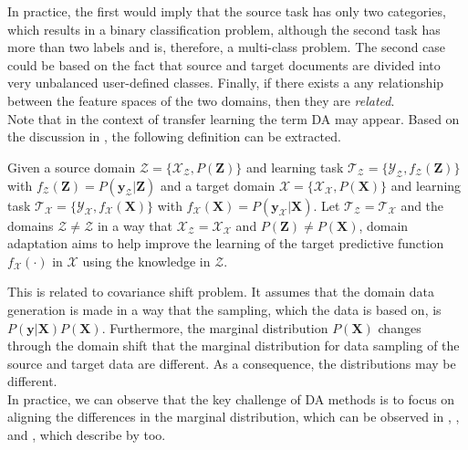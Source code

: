 In practice, the first would imply that the source task has only two categories, which results in a binary classification problem, although the second task has more than two labels and is, therefore, a multi-class problem.
The second case could be based on the fact that source and target documents are divided into very unbalanced user-defined classes.
Finally, if there exists a any relationship between the feature spaces of the two domains, then they are \textit{related}.\cite{Pan.2010}\\
Note that in the context of transfer learning the term \ac{DA} may appear.
Based on the discussion in \cite{Pan.2011}, the following definition can be extracted.
\begin{mDef}\label{DefDa}
	Given a source domain $\mathcal{Z}=\{\mathcal{X}_\mathcal{Z},P(\mathbf{Z})\}$ and learning task $\mathcal{T_Z}=\{\mathcal{Y_Z},f_\mathcal{Z}(\mathbf{Z})\}$ with $f_\mathcal{Z}(\mathbf{Z}) = P(\mathbf{y}_\mathcal{Z}|\mathbf{Z})$ and a target domain $\mathcal{X}=\{\mathcal{X}_\mathcal{X},P(\mathbf{X})\}$ and learning task $\mathcal{T_X}=\{\mathcal{Y_X},f_\mathcal{X}(\mathbf{X})\}$ with $f_\mathcal{X}(\mathbf{X}) = P(\mathbf{y}_\mathcal{X}|\mathbf{X})$. Let $\mathcal{T_Z} = \mathcal{T_X}$ and the domains $\mathcal{Z} \neq \mathcal{Z}$ in a way that $\mathcal{X}_\mathcal{Z} = \mathcal{X}_\mathcal{X}$ and $P(\mathbf{Z}) \neq P(\mathbf{X})$, domain adaptation aims to help improve the learning of the target predictive function $f_\mathcal{X}(\cdot)$ in $\mathcal{X}$ using the knowledge in $\mathcal{Z}$.
\end{mDef}
This is related to covariance shift problem.\cite{Pan.2011}
It assumes that the domain data generation is made in a way that the sampling, which the data is based on, is $P(\mathbf{y}\vert \mathbf{X})P(\mathbf{X})$.
Furthermore, the marginal distribution $P(\mathbf{X})$ changes through the domain shift that the marginal distribution for data sampling of the source and target data are different. As a consequence, the distributions may be different.\cite[p. 8-9]{QuinoneroCandela.2009}\\
In practice, we can observe that the key challenge of \acl{DA} methods is to focus on aligning the differences in the marginal distribution, which can be observed in \cite{Pan.2011}, \cite{Long.}, \cite{Fernando.} and \cite{Arnold.2007}, which describe by \cite{Pan.2011} too.

